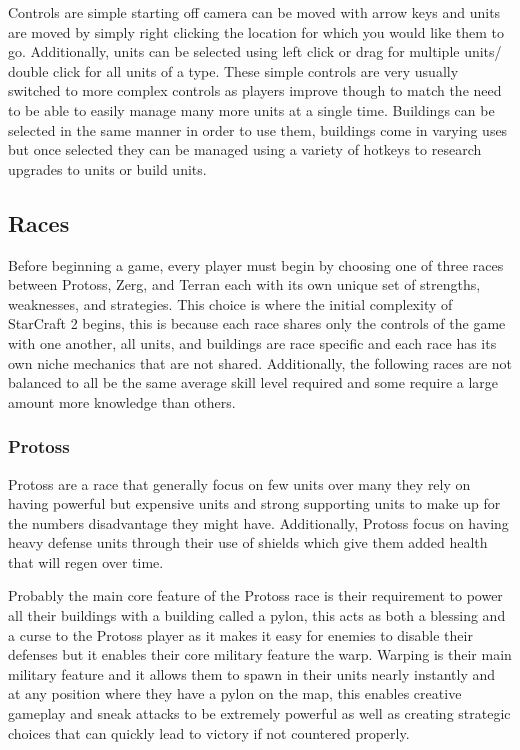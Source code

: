 \documentclass[a4paper,12pt]{report}
\begin{document}
Controls are simple starting off camera can be moved with arrow keys and units are moved by simply right clicking the location for which you would like them to go. Additionally, units can be selected using left click or drag for multiple units/ double click for all units of a type. These simple controls are very usually switched to more complex controls as players improve though to match the need to be able to easily manage many more units at a single time. Buildings can be selected in the same manner in order to use them, buildings come in varying uses but once selected they can be managed using a variety of hotkeys to research upgrades to units or build units.

\subsection{Races}

Before beginning a game, every player must begin by choosing one of three races between Protoss, Zerg, and Terran each with its own unique set of strengths, weaknesses, and strategies. This choice is where the initial complexity of StarCraft 2 begins, this is because each race shares only the controls of the game with one another, all units, and buildings are race specific and each race has its own niche mechanics that are not shared. Additionally, the following races are not balanced to all be the same average skill level required and some require a large amount more knowledge than others.

\subsubsection{Protoss}

Protoss are a race that generally focus on few units over many they rely on having powerful but expensive units and strong supporting units to make up for the numbers disadvantage they might have. Additionally, Protoss focus on having heavy defense units through their use of shields which give them added health that will regen over time.

Probably the main core feature of the Protoss race is their requirement to power all their buildings with a building called a pylon, this acts as both a blessing and a curse to the Protoss player as it makes it easy for enemies to disable their defenses but it enables their core military feature the warp. Warping is their main military feature and it allows them to spawn in their units nearly instantly and at any position where they have a pylon on the map, this enables creative gameplay and sneak attacks to be extremely powerful as well as creating strategic choices that can quickly lead to victory if not countered properly.
\end{document}
